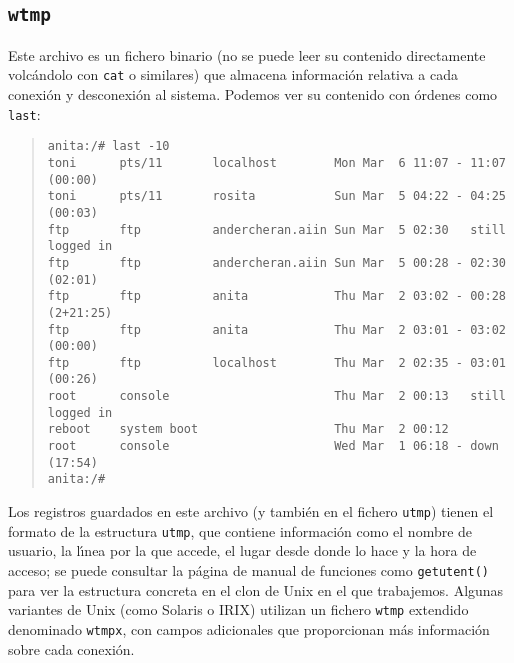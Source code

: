 \subsection{{\tt wtmp}}
Este archivo es un fichero binario (no se puede leer su contenido directamente
volc\'andolo con {\tt cat} o similares) que almacena informaci\'on relativa a
cada conexi\'on y desconexi\'on al sistema. Podemos ver su contenido con 
\'ordenes como {\tt last}:
\begin{quote}
\begin{verbatim}
anita:/# last -10
toni      pts/11       localhost        Mon Mar  6 11:07 - 11:07  (00:00)
toni      pts/11       rosita           Sun Mar  5 04:22 - 04:25  (00:03)
ftp       ftp          andercheran.aiin Sun Mar  5 02:30   still logged in
ftp       ftp          andercheran.aiin Sun Mar  5 00:28 - 02:30  (02:01)
ftp       ftp          anita            Thu Mar  2 03:02 - 00:28 (2+21:25)
ftp       ftp          anita            Thu Mar  2 03:01 - 03:02  (00:00)
ftp       ftp          localhost        Thu Mar  2 02:35 - 03:01  (00:26)
root      console                       Thu Mar  2 00:13   still logged in
reboot    system boot                   Thu Mar  2 00:12 
root      console                       Wed Mar  1 06:18 - down   (17:54)
anita:/# 
\end{verbatim}
\end{quote}
Los registros guardados en este archivo (y tambi\'en en el fichero {\tt utmp}) 
tienen el
formato de la estructura {\tt utmp}, que contiene informaci\'on como el
nombre de usuario, la l\'{\i}nea por la que accede, el lugar desde donde lo
hace y la hora de acceso; se puede consultar la p\'agina de manual de funciones
como {\tt getutent()} para ver la estructura concreta en el clon de Unix en el
que trabajemos. Algunas variantes de Unix (como Solaris o IRIX) utilizan un 
fichero {\tt wtmp} extendido denominado {\tt wtmpx}, con campos adicionales
que proporcionan m\'as informaci\'on sobre cada conexi\'on.
